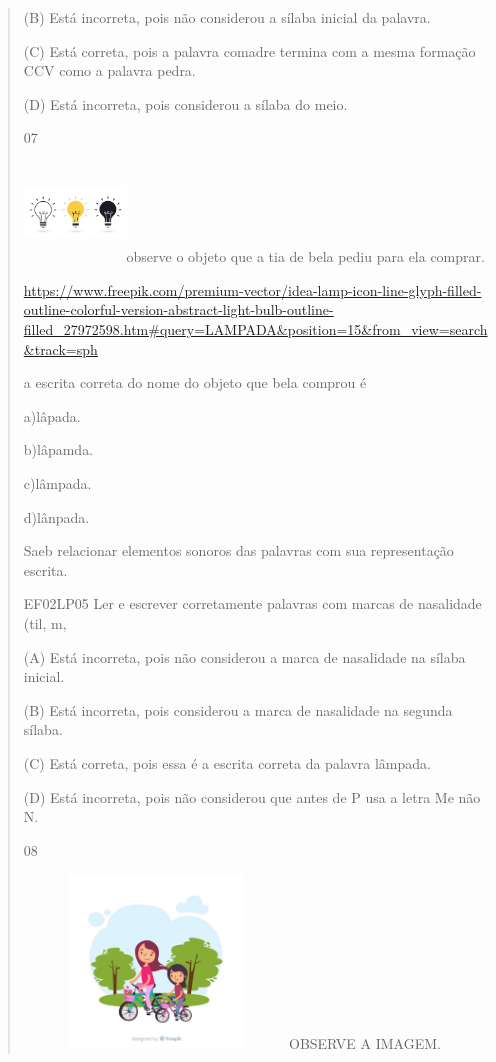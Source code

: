 \begin{verse}
{{{{{{{{{{{{{{{{{{{{(B) Está incorreta, pois não considerou a sílaba inicial da palavra.

(C) Está correta, pois a palavra comadre termina com a mesma formação
CCV como a palavra pedra.

(D) Está incorreta, pois considerou a sílaba do meio.

\num{07}

\includegraphics[width=1.07025in,height=1.04487in]{media/image178.jpeg}observe
o objeto que a tia de bela pediu para ela comprar.

\url{https://www.freepik.com/premium-vector/idea-lamp-icon-line-glyph-filled-outline-colorful-version-abstract-light-bulb-outline-filled_27972598.htm\#query=LAMPADA\&position=15\&from_view=search\&track=sph}

a escrita correta do nome do objeto que bela comprou é

a)lâpada.

b)lâpamda.

c)lâmpada.

d)lânpada.

Saeb relacionar elementos sonoros das palavras com sua representação
escrita.

EF02LP05 Ler e escrever corretamente palavras com marcas de nasalidade
(til, m,

(A) Está incorreta, pois não considerou a marca de nasalidade na sílaba
inicial.

(B) Está incorreta, pois considerou a marca de nasalidade na segunda
sílaba.

(C) Está correta, pois essa é a escrita correta da palavra lâmpada.

(D) Está incorreta, pois não considerou que antes de P usa a letra Me
não N.

\num{08}

\includegraphics[width=2.76266in,height=1.82051in]{media/image179.png}OBSERVE
A IMAGEM.

}}}}}}}}}}}}}}}}}}}}
\end{verse}
